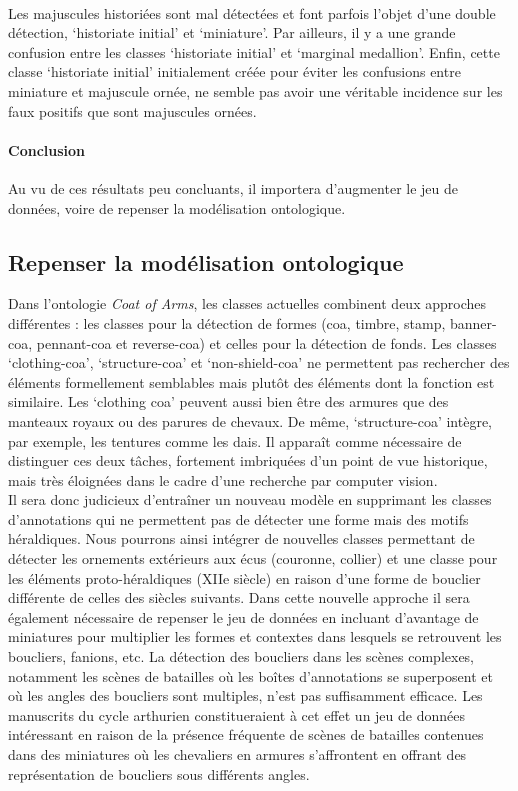 \documentclass[12pt,twoside]{book}
\begin{document}
\paragraph{}Les majuscules historiées sont mal détectées et font parfois l’objet d’une double détection, ‘historiate initial’ et ‘miniature’. Par ailleurs, il y a une grande confusion entre les classes ‘historiate initial’ et ‘marginal medallion’. Enfin, cette classe ‘historiate initial’ initialement créée pour éviter les confusions entre miniature et majuscule ornée, ne semble pas avoir une véritable incidence sur les faux positifs que sont majuscules ornées. 

\paragraph{Conclusion}Au vu de ces résultats peu concluants, il importera d’augmenter le jeu de données, voire de repenser la modélisation ontologique. 

\subsection{Repenser la modélisation ontologique}

Dans l’ontologie \textit{Coat of Arms}, les classes actuelles combinent deux approches différentes : les classes pour la détection de formes (coa, timbre, stamp, banner-coa, pennant-coa et reverse-coa) et celles pour la détection de fonds. Les classes ‘clothing-coa’, ‘structure-coa’ et ‘non-shield-coa’ ne permettent pas rechercher des éléments formellement semblables mais plutôt des éléments dont la fonction est similaire. Les ‘clothing coa’ peuvent aussi bien être des armures que des manteaux royaux ou des parures de chevaux. De même, ‘structure-coa’ intègre, par exemple, les tentures comme les dais. Il apparaît comme nécessaire de distinguer ces deux tâches, fortement imbriquées d’un point de vue historique, mais très éloignées dans le cadre d’une recherche par computer vision. \\

Il sera donc judicieux d’entraîner un nouveau modèle en supprimant les classes d’annotations qui ne permettent pas de détecter une forme mais des motifs héraldiques. Nous pourrons ainsi intégrer de nouvelles classes permettant de détecter les ornements extérieurs aux écus (couronne, collier) et une classe pour les éléments proto-héraldiques (XIIe siècle) en raison d’une forme de bouclier différente de celles des siècles suivants. Dans cette nouvelle approche il sera également nécessaire de repenser le jeu de données en incluant d’avantage de miniatures pour multiplier les formes et contextes dans lesquels se retrouvent les boucliers, fanions, etc. La détection des boucliers dans les scènes complexes, notamment les scènes de batailles où les boîtes d’annotations se superposent et où les angles des boucliers sont multiples, n’est pas suffisamment efficace. Les manuscrits du cycle arthurien constitueraient à cet effet un jeu de données intéressant en raison de la présence fréquente de scènes de batailles contenues dans des miniatures où les chevaliers en armures s'affrontent en offrant des représentation de boucliers sous différents angles. \\
\end{document}

